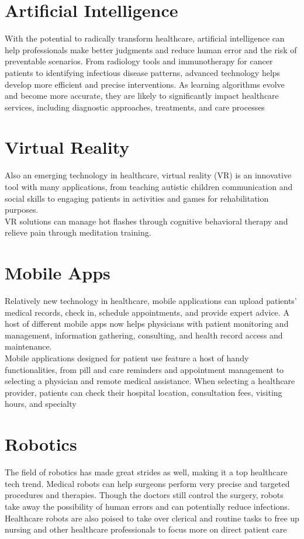 \documentclass[12pt]{article}
\begin{document}
\section*{Artificial Intelligence}

With the potential to radically transform healthcare, artificial intelligence can help professionals make better judgments and reduce human error and the risk of preventable scenarios. From radiology tools and immunotherapy for cancer patients to identifying infectious disease patterns, advanced technology helps develop more efficient and precise interventions. As learning algorithms evolve and become more accurate, they are likely to significantly impact healthcare services, including diagnostic approaches, treatments, and care processes

\section*{Virtual Reality}
Also an emerging technology in healthcare, virtual reality (VR) is an innovative tool with many applications, from teaching autistic children communication and social skills to engaging patients in activities and games for rehabilitation purposes.\\ 
VR solutions can manage hot flashes through cognitive behavioral therapy and relieve pain through meditation training. 


\section*{Mobile Apps}
Relatively new technology in healthcare, mobile applications can upload patients’ medical records, check in, schedule appointments, and provide expert advice. A host of different mobile apps now helps physicians with patient monitoring and management, information gathering, consulting, and health record access and maintenance. \\
Mobile applications designed for patient use feature a host of handy functionalities, from pill and care reminders and appointment management to selecting a physician and remote medical assistance. When selecting a healthcare provider, patients can check their hospital location, consultation fees, visiting hours, and specialty


\section*{Robotics}
The field of robotics has made great strides as well, making it a top healthcare tech trend. Medical robots can help surgeons perform very precise and targeted procedures and therapies. Though the doctors still control the surgery, robots take away the possibility of human errors and can potentially reduce infections. Healthcare robots are also poised to take over clerical and routine tasks to free up nursing and other healthcare professionals to focus more on direct patient care
\end{document}
